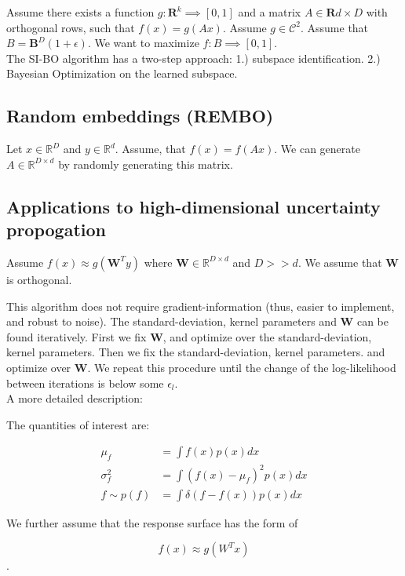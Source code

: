 \citep{Djolonga2013} Assume there exists a function $g : \mathbf{R}^k \implies [0, 1]$ and a matrix $A \in \mathbf{R}{d \times D}$ with orthogonal rows, such that $f(x) = g(Ax) $. Assume $g \in \mathcal{C}^2$. 
Assume that $B = \mathbf{B}^D (1 + \epsilon ) $.
We want to maximize $f: B \implies [0, 1] $.\\

The SI-BO algorithm has a two-step approach:
1.) subspace identification.
2.) Bayesian Optimization on the learned subspace.


\subsection{Random embeddings (REMBO)}
\citep{Wang2013} Let $x \in \mathbb{R}^D$ and $y \in \mathbb{R}^d$. Assume, that $f(x) = f(Ax)$. We can generate $A \in \mathbb{R}^{D \times d}$ by randomly generating this matrix.

\subsection{Applications to high-dimensional uncertainty propogation}
\citep{Tripathy} Assume $f(x) \approx g( \mathbf{W}^T y)$ where $ \mathbf{W} \in \mathbb{R}^{D \times d} $ and $D >> d$.
We assume that $ \mathbf{W} $ is orthogonal.

This algorithm does not require gradient-information (thus, easier to implement, and robust to noise).
The standard-deviation, kernel parameters and  $ \mathbf{W} $ can be found iteratively.
First we fix $ \mathbf{W} $, and optimize over the standard-deviation, kernel parameters.
Then we fix the standard-deviation, kernel parameters. and optimize over $ \mathbf{W} $.
We repeat this procedure until the change of the log-likelihood between iterations is below some $ \epsilon_l $.\\

A more detailed description:

The quantities of interest are:

\begin{align}
\mu_f &= \int f(x) p(x) dx \\
\sigma^2_f &= \int ( f(x) - \mu_f )^2 p(x) dx \\
f \sim p(f) &= \int \delta( f - f(x) ) p(x) dx
\end{align}

We further assume that the response surface has the form of 

$$
f(x) \approx g(W^T x)
$$.

